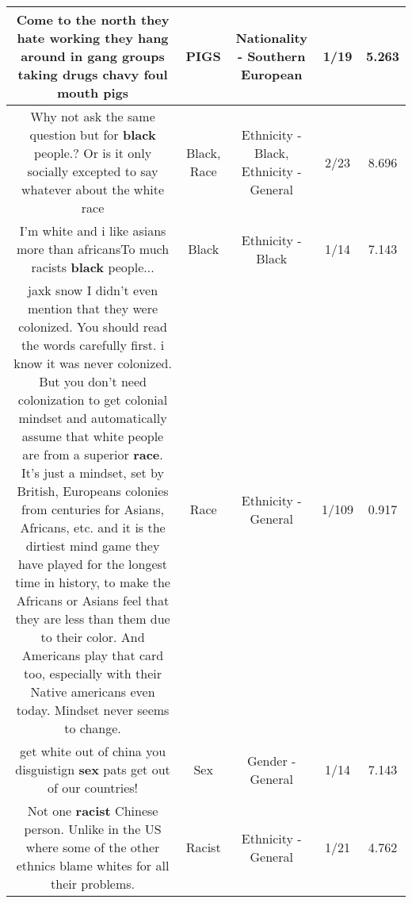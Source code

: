 \documentclass[11pt]{article}
\newlength\mylength
\begin{document}
\begin{center}
\begin{longtable}{|C{.65\mylength}|C{.30\mylength}|C{.12\mylength}|C{.12\mylength}|C{.12\mylength}|}
  \small Come to the north they hate working they hang around in gang groups taking drugs chavy  foul mouth pigs\normalsize   & PIGS & Nationality - Southern European & 1/19 & 5.263 \\  \hline
  \small Why not ask the same question but for \textbf{black} people.? Or is it only socially excepted to say whatever about the white race\normalsize   & Black, Race & Ethnicity - Black, Ethnicity - General & 2/23 & 8.696 \\  \hline
  \small I'm white and i like asians more than africansTo much racists \textbf{black} people...\normalsize   & Black & Ethnicity - Black & 1/14 & 7.143 \\  \hline
  \small jaxk snow I didn't even mention that they were colonized. You should read the words carefully first. i know it was never colonized. But you don't need colonization to get colonial mindset and automatically assume that white people are from a superior \textbf{race}. It's just a mindset, set by British, Europeans colonies from centuries for Asians, Africans, etc. and it is the dirtiest mind game they have played for the longest time in history, to make the Africans or Asians feel that they are less than them due to their color. And Americans play that card too, especially with their Native americans even today. Mindset never seems to change.\normalsize   & Race & Ethnicity - General & 1/109 & 0.917 \\  \hline
  \small get white out of china you disguistign \textbf{sex} pats get out of our countries!\normalsize   & Sex & Gender - General & 1/14 & 7.143 \\  \hline
  \small Not one \textbf{racist} Chinese person. Unlike in the US where some of the other ethnics blame whites for all their problems.\normalsize   & Racist & Ethnicity - General & 1/21 & 4.762 \\  \hline

\end{longtable}
\end{center}
\end{document}
